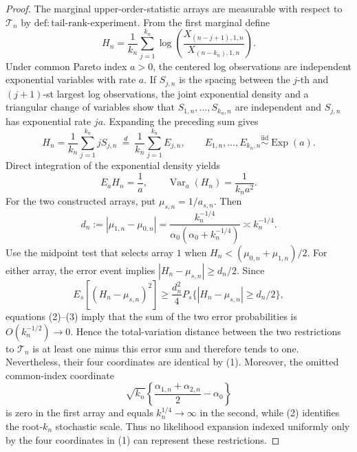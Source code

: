 \documentclass{article}
\begin{document}
\begin{proof}
The marginal upper-order-statistic arrays are measurable with respect to \(\mathcal T_n\) by \(\mathrm{def{:}tail\text{-}rank\text{-}experiment}\).  From the first marginal define
\[
 H_n=\frac1{k_n}\sum_{j=1}^{k_n}
 \log\!\left(\frac{X_{(n-j+1),1,n}}{X_{(n-k_n),1,n}}\right).
\]
Under common Pareto index \(a>0\), the centered log observations are independent exponential variables with rate \(a\).  If \(S_{j,n}\) is the spacing between the \(j\)-th and \((j+1)\)-st largest log observations, the joint exponential density and a triangular change of variables show that \(S_{1,n},\ldots,S_{k_n,n}\) are independent and \(S_{j,n}\) has exponential rate \(ja\).  Expanding the preceding sum gives
\[
 H_n=\frac1{k_n}\sum_{j=1}^{k_n}jS_{j,n}
 \ \stackrel{d}{=}\ \frac1{k_n}\sum_{j=1}^{k_n}E_{j,n},
 \qquad E_{1,n},\ldots,E_{k_n,n}\overset{\mathrm{iid}}{\sim}\operatorname{Exp}(a).
\]
Direct integration of the exponential density yields
\[
 E_aH_n=\frac1a,\qquad
 \operatorname{Var}_a(H_n)=\frac1{k_na^2}. \tag{2}
\]
For the two constructed arrays, put \(\mu_{s,n}=1/a_{s,n}\).  Then
\[
 d_n:=|\mu_{1,n}-\mu_{0,n}|
 =\frac{k_n^{-1/4}}{\alpha_0(\alpha_0+k_n^{-1/4})}
 \asymp k_n^{-1/4}. \tag{3}
\]
Use the midpoint test that selects array \(1\) when \(H_n<(\mu_{0,n}+\mu_{1,n})/2\).  For either array, the error event implies \(|H_n-\mu_{s,n}|\geq d_n/2\).  Since
\[
 E_s[(H_n-\mu_{s,n})^2]
 \geq \frac{d_n^2}{4}
 P_s\{|H_n-\mu_{s,n}|\geq d_n/2\},
\]
equations (2)--(3) imply that the sum of the two error probabilities is \(O(k_n^{-1/2})\to0\).  Hence the total-variation distance between the two restrictions to \(\mathcal T_n\) is at least one minus this error sum and therefore tends to one.  Nevertheless, their four coordinates are identical by (1).  Moreover, the omitted common-index coordinate
\[
 \sqrt{k_n}\left\{\frac{\alpha_{1,n}+\alpha_{2,n}}2-\alpha_0\right\}
\]
is zero in the first array and equals \(k_n^{1/4}\to\infty\) in the second, while (2) identifies the root-\(k_n\) stochastic scale.  Thus no likelihood expansion indexed uniformly only by the four coordinates in (1) can represent these restrictions.


\end{proof}
\end{document}
